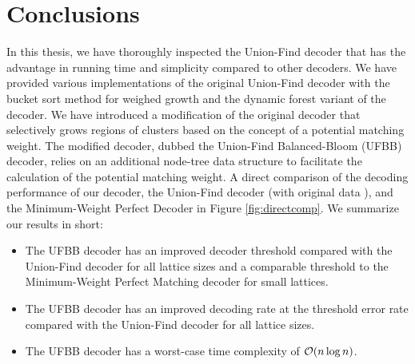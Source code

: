 \chapter{Conclusions}

In this thesis, we have thoroughly inspected the Union-Find decoder that has the advantage in running time and simplicity compared to other decoders. We have provided various implementations of the original Union-Find decoder with the bucket sort method for weighed growth and the dynamic forest variant of the decoder. We have introduced a modification of the original decoder that selectively grows regions of clusters based on the concept of a potential matching weight. The modified decoder, dubbed the Union-Find Balanced-Bloom (UFBB) decoder, relies on an additional node-tree data structure to facilitate the calculation of the potential matching weight. A direct comparison of the decoding performance of our decoder, the Union-Find decoder (with original data \cite{delfosse2017almost}), and the Minimum-Weight Perfect Decoder in Figure \ref{fig:directcomp}. We summarize our results in short:

\begin{itemize}
  \item The UFBB decoder has an improved decoder threshold compared with the Union-Find decoder for all lattice sizes and a comparable threshold to the Minimum-Weight Perfect Matching decoder for small lattices.
  \item The UFBB decoder has an improved decoding rate at the threshold error rate compared with the Union-Find decoder for all lattice sizes. 
  \item The UFBB decoder has a worst-case time complexity of $\mathcal{O}(n \log{n})$. 
\end{itemize}

